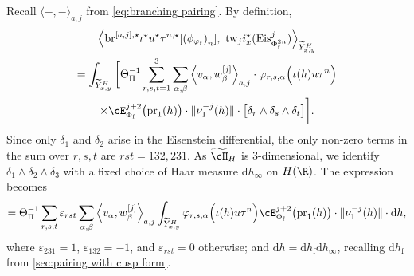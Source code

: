 \documentclass[10pt,reqno,a4paper]{amsart}
\newcommand{\Phif}{{\Phi\subf}}
\newcommand{\subf}{_{\mathrm{f}}}
\begin{document}
Recall $\langle-,-\rangle_{a,j}$ from \eqref{eq:branching pairing}. By definition,
\begin{multline*}
\Big\langle \mathrm{br}^{[a,j],\star}  \iota^{\star}  u^\star  \tau^{n,\star}[\left(\phi_{\varphi\subf}\right)_n], \ 	  \mathrm{tw}_{j}  i_{x}^\star(\mathrm{Eis}_{\Phi\subf^{2n}}^{j}) \Big\rangle_{\widetilde{Y}^H_{x,y}}\\
= \int_{\widetilde{Y}^H_{x,y}} \bigg[ \Theta_\Pi^{-1}\sum_{r,s,t = 1}^3 \sum_{\alpha,\beta} \left\langle v_\alpha, w_\beta^{[j]}\right\rangle_{a,j} \cdot \varphi_{r,s,\alpha}\Big(\iota(h)u\tau^{n}\Big)  \\
\times \cE_{\Phif}^{j+2} \big(\mathrm{pr}_1(h)\big) \cdot \|\nu_1^{-j}(h)\|\cdot  \big[\delta_r\wedge \delta_s \wedge \delta_t\big]\bigg].
\end{multline*}
Since only $\delta_1$ and $\delta_2$ arise in the Eisenstein differential, the only non-zero terms in the sum over $r,s,t$ are $rst = 132,231$. As $\widetilde{\cH}_H$ is 3-dimensional, we identify $\delta_1\wedge \delta_2\wedge \delta_3$ with a fixed choice of Haar measure $\mathrm{d}h_\infty$ on $H(\R)$. The expression becomes
\begin{equation}\label{eq:cup product component}
= \Theta_\Pi^{-1}\sum_{r,s,t} \varepsilon_{rst} \sum_{\alpha,\beta} \left\langle v_\alpha, w_\beta^{[j]}\right\rangle_{a,j}\int_{\widetilde{Y}_{x,y}^H}  \varphi_{r,s,\alpha}\Big(\iota(h)u\tau^{n}\Big)   \cE_{\Phif}^{j+2} \big(\mathrm{pr}_1(h)\big) \cdot \|\nu_1^{-j}(h)\| \cdot \mathrm{d}h,
\end{equation}
where $\varepsilon_{231} = 1$, $\varepsilon_{132} = -1$, and $\varepsilon_{rst} = 0$ otherwise; and $\mathrm{d}h = \mathrm{d}h\subf\mathrm{d}h_\infty$, recalling $\mathrm{d}h\subf$ from \cref{sec:pairing with cusp form}.
\end{document}
